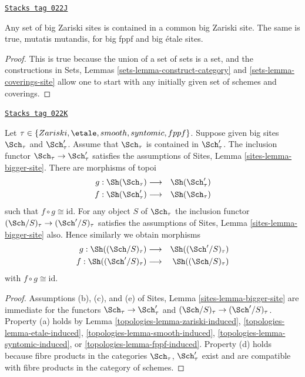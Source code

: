 \begin{lemma}[Contained in]
\label{topologies-lemma-contained-in}
\href{https://stacks.math.columbia.edu/tag/022J}{\texttt{Stacks tag 022J}}

Any set of big Zariski sites is contained in a common big Zariski site.
The same is true, mutatis mutandis, for big fppf and big \'etale sites.
\end{lemma}

\begin{proof}
This is true because the union of a set of sets is a set, and the
constructions in Sets, Lemmas \ref{sets-lemma-construct-category} and
\ref{sets-lemma-coverings-site}
allow one to start with any initially given set of schemes
and coverings.
\end{proof}

\begin{lemma}
\label{topologies-lemma-change-alpha}
\href{https://stacks.math.columbia.edu/tag/022K}{\texttt{Stacks tag 022K}}

Let $\tau \in \{Zariski, \etale, smooth, syntomic, fppf\}$.
Suppose given big sites $\Sch_\tau$ and $\Sch'_\tau$.
Assume that $\Sch_\tau$ is contained in $\Sch'_\tau$.
The inclusion functor $\Sch_\tau \to \Sch'_\tau$ satisfies
the assumptions of Sites, Lemma \ref{sites-lemma-bigger-site}.
There are morphisms of topoi
\begin{eqnarray*}
g : \Sh(\Sch_\tau) &
\longrightarrow &
\Sh(\Sch'_\tau) \\
f : \Sh(\Sch'_\tau) &
\longrightarrow &
\Sh(\Sch_\tau)
\end{eqnarray*}
such that $f \circ g \cong \text{id}$. For any object $S$
of $\Sch_\tau$ the inclusion functor
$(\Sch/S)_\tau \to (\Sch'/S)_\tau$ satisfies
the assumptions of Sites, Lemma \ref{sites-lemma-bigger-site}
also. Hence similarly we obtain morphisms
\begin{eqnarray*}
g : \Sh((\Sch/S)_\tau) &
\longrightarrow &
\Sh((\Sch'/S)_\tau) \\
f : \Sh((\Sch'/S)_\tau) &
\longrightarrow &
\Sh((\Sch/S)_\tau)
\end{eqnarray*}
with $f \circ g \cong \text{id}$.
\end{lemma}

\begin{proof}

Assumptions (b), (c), and (e) of
Sites, Lemma \ref{sites-lemma-bigger-site}
are immediate for the functors
$\Sch_\tau \to \Sch'_\tau$ and
$(\Sch/S)_\tau \to (\Sch'/S)_\tau$. Property (a) holds by
Lemma \ref{topologies-lemma-zariski-induced},
\ref{topologies-lemma-etale-induced},
\ref{topologies-lemma-smooth-induced},
\ref{topologies-lemma-syntomic-induced}, or
\ref{topologies-lemma-fppf-induced}.
Property (d) holds because
fibre products in the categories $\Sch_\tau$, $\Sch'_\tau$
exist and are compatible with fibre products in the category of schemes.
\end{proof}

